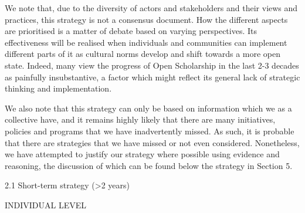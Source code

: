 \documentclass[]{article}
\begin{document}
We note that, due to the diversity of actors and stakeholders and their
views and practices, this strategy is not a consensus document. How the
different aspects are prioritised is a matter of debate based on varying
perspectives. Its effectiveness will be realised when individuals and
communities can implement different parts of it as cultural norms
develop and shift towards a more open state. Indeed, many view the
progress of Open Scholarship in the last 2-3 decades as painfully
insubstantive, a factor which might reflect its general lack of
strategic thinking and implementation.

We also note that this strategy can only be based on information which
we as a collective have, and it remains highly likely that there are
many initiatives, policies and programs that we have inadvertently
missed. As such, it is probable that there are strategies that we have
missed or not even considered. Nonetheless, we have attempted to justify
our strategy where possible using evidence and reasoning, the discussion
of which can be found below the strategy in Section 5.

2.1 Short-term strategy (\textgreater{}2 years)

INDIVIDUAL LEVEL
\end{document}
